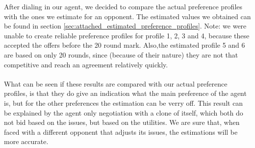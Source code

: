 After dialing in our agent, we decided to compare the actual preference profiles with the ones we estimate for an opponent.
The estimated values we obtained can be found in section \ref{sec:attached_estimated_preference_profiles}. Note: we were unable to create reliable preference profiles for profile 1, 2, 3 and 4, because these accepted the offers before the 20 round mark. Also,the estimated profile 5 and 6 are based on only 20 rounds, since (because of their nature) they are not that competitive and reach an agreement relatively quickly.
\\\\
What can be seen if these results are compared with our actual preference profiles, is that they do give an indication what the main preference of the agent is, but for the other preferences the estimation can be verry off. This result can be explained by the agent only negotiation with a clone of itself, which both do not bid based on the issues, but based on the utilities. We are sure that, when faced with a different opponent that adjusts its issues, the estimations will be more accurate.